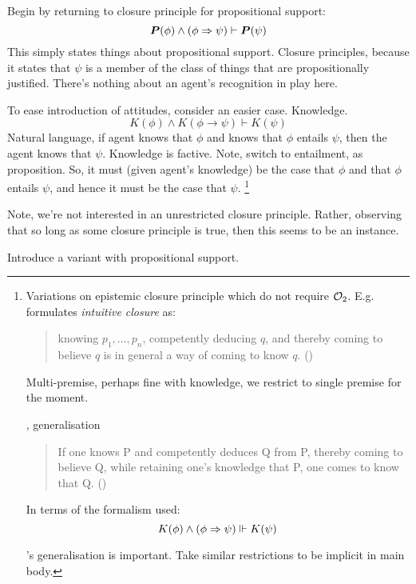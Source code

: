 \begin{note}
  Begin by returning to closure principle for propositional support:
  \[\bm{P}(\phi) \land (\phi \Rightarrow{} \psi) \vdash \bm{P}(\psi)\]
  This simply states things about propositional support.
  Closure principles, because it states that \(\psi\) is a member of the class of things that are propositionally justified.
  There's nothing about an agent's recognition in play here.

  To ease introduction of attitudes, consider an easier case.
  Knowledge.
  \[K(\phi) \land K(\phi \rightarrow \psi) \vdash K(\psi)\]
  Natural language, if agent knows that \(\phi\) and knows that \(\phi\) entails \(\psi\), then the agent knows that \(\psi\).
  Knowledge is factive.
  Note, switch to entailment, as proposition.
  So, it must (given agent's knowledge) be the case that \(\phi\) and that \(\phi\) entails \(\psi\), and hence it must be the case that \(\psi\).\nolinebreak
  \footnote{
    Variations on epistemic closure principle which do not require \(\mathcal{O}_{2}\).
    E.g.\ \citeauthor{Williamson:2000wx} formulates \emph{intuitive closure} as:
    \begin{quote}
      knowing \(p_{1},\dots,p_{n}\), competently deducing \(q\), and thereby coming to believe \(q\) is in general a way of coming to know \(q\).\nolinebreak
      \mbox{}\hfill\mbox{(\citeyear[117]{Williamson:2000wx})}
    \end{quote}
    Multi-premise, perhaps fine with knowledge, we restrict to single premise for the moment.

    \citeauthor{Hawthorne:2005tb}, generalisation
    \begin{quote}
      If one knows P and competently deduces Q from P, thereby coming to believe Q, while retaining one's knowledge that P, one comes to know that Q.\nolinebreak
      \mbox{}\hfill\mbox{(\citeyear[29]{Hawthorne:2005tb})}
    \end{quote}
    In terms of the formalism used:
    \[K(\phi) \land (\phi \Rightarrow{} \psi) \Vdash K(\psi)\]

    \citeauthor{Hawthorne:2005tb}'s generalisation is important.
    Take similar restrictions to be implicit in main body.
    
  }

  Note, we're not interested in an unrestricted closure principle.
  Rather, observing that so long as some closure principle is true, then this seems to be an instance.

  Introduce a variant with propositional support.


\end{note}
